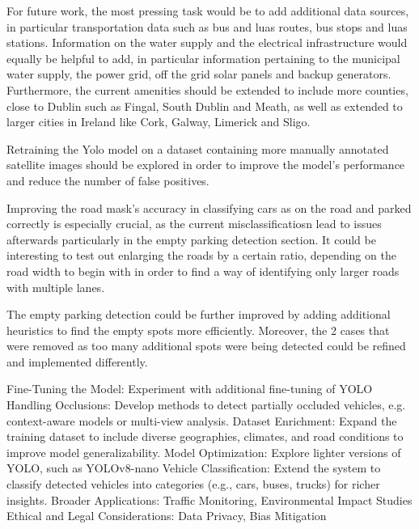For future work, the most pressing task would be to add additional data sources,
in particular transportation data such as bus and luas routes, bus stops and
luas stations. Information on the water supply and the electrical infrastructure
would equally be helpful to add, in particular information pertaining to the
municipal water supply, the power grid, off the grid solar panels and backup
generators. Furthermore, the current amenities should be extended to include
more counties, close to Dublin such as Fingal, South Dublin and Meath, as well
as extended to larger cities in Ireland like Cork, Galway, Limerick and Sligo.

Retraining the Yolo model on a dataset containing more manually annotated
satellite images should be explored in order to improve the model's performance
and reduce the number of false positives.

Improving the road mask's accuracy in classifying cars as on the road and parked
correctly is especially crucial, as the current misclassificatiosn lead to
issues afterwards particularly in the empty parking detection section. It could
be interesting to test out enlarging the roads by a certain ratio, depending on
the road width to begin with in order to find a way of identifying only larger
roads with multiple lanes.

The empty parking detection could be further improved by adding additional
heuristics to find the empty spots more efficiently. Moreover, the 2 cases that
were removed as too many additional spots were being detected could be refined
and implemented differently.

Fine-Tuning the Model: Experiment with additional fine-tuning of YOLO
Handling Occlusions: Develop methods to detect partially occluded vehicles, e.g. context-aware models or multi-view analysis.
Dataset Enrichment: Expand the training dataset to include diverse geographies, climates, and road conditions to improve model generalizability.
Model Optimization: Explore lighter versions of YOLO, such as YOLOv8-nano
Vehicle Classification: Extend the system to classify detected vehicles into categories (e.g., cars, buses, trucks) for richer insights.
Broader Applications: Traffic Monitoring, Environmental Impact Studies
Ethical and Legal Considerations: Data Privacy, Bias Mitigation